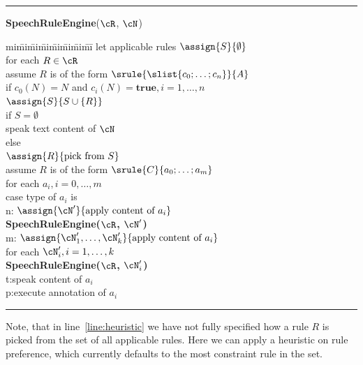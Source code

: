 \documentclass{sig-alternate}
\begin{document}
\vspace{.3cm}\hrule\vspace{.2cm}
\noindent \textbf{SpeechRuleEngine}($\cR$, $\cN$)
\vspace{-.2cm}\begin{ntabbing}
  mi\=mi\=mi\=mi\=mi\=mi\=mi\=mi\=\kill
  let applicable rules $\assign{S}{\emptyset}$\label{}\\
  for each $R\in \cR$\label{}\\
  \> assume $R$ is of the form $\srule{\slist{c_0;\ldots;c_n}}{A}$\label{}\\
  \> if $c_0(N) = N$ and $c_i(N) = \mathbf{true}, i=1,\ldots,n$\label{}\\
  \>\> $\assign{S}{S\cup\{R\}}$\label{}\\
  if $S=\emptyset$\label{}\\
  \> speak text content of $\cN$\label{line:default}\\
  else \label{}\\
  \> $\assign{R}{\mbox{pick from }S}$ \label{line:heuristic}\\
  \> assume $R$ is of the form $\srule{C}{a_0;\ldots;a_m}$\label{}\\
  \> for each $a_i, i=0,\ldots,m$\label{}\\
  \>\>case type of $a_i$ is\label{}\\
  \>\>\>n:\> $\assign{\cN'}{\mbox{apply content of } a_i}$\label{line:case-n}\\
  \>\>\>\>\textbf{SpeechRuleEngine($\cR$, $\cN'$)}\label{}\\
  \>\>\>m:\> $\assign{\cN_1',\ldots,\cN_k'}{\mbox{apply content of } a_i}$\label{line:case-m}\\
  \>\>\>\>for each $\cN_i', i=1,\ldots,k$\label{}\\
  \>\>\>\>\>\textbf{SpeechRuleEngine($\cR$, $\cN_i'$)}\label{}\\
  \>\>\>t:\>speak content of $a_i$\label{line:case-t}\\
  \>\>\>p:\>execute annotation of $a_i$\label{line:case-p}\\
\end{ntabbing}
\vspace{-.5cm}\hrule\vspace{.2cm} 

Note, that in line~\ref{line:heuristic} we have not fully specified how a rule $R$ is
picked from the set of all applicable rules. Here we can apply a heuristic on
rule preference, which currently defaults to the most constraint rule in the
set.
\end{document}
